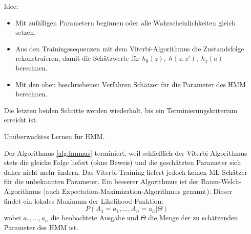 Idee:
\begin{itemize}
	\item Mit zufälligen Parametern beginnen oder alle Wahrscheinlichkeiten gleich setzen.
	\item Aus den Trainingssequenzen mit dem Viterbi-Algorithmus die Zustandsfolge rekonstruieren, damit die Schätzwerte für \(h_0(z),\; h(z,z'),\; h_z(a)\) berechnen.
	\item Mit den oben beschriebenen Verfahren Schätzer für die Parameter des HMM berechnen.
\end{itemize}
Die letzten beiden Schritte werden wiederholt, bis ein Terminierungskriterium erreicht ist.
\begin{algorithm}
	\begin{algorithmic}[1]
		\Repeat
	\end{algorithmic}
	\caption{Unüberwachtes Lernen für HMM.}
	\label{alg:hmmus}
\end{algorithm}
Der Algorithmus \ref{alg:hmmus} terminiert, weil schließlich der Viterbi-Algorithmus stets die gleiche Folge liefert (ohne Beweis) und die geschätzten Parameter sich daher nicht mehr ändern.
Das Viterbi-Training liefert jedoch keinen ML-Schätzer für die unbekannten
Parameter. Ein besserer Algorithmus ist der Baum-Welch-Algorithmus (auch
Expectation-Maximization-Algorithmus genannt).
Dieser findet ein lokales Maximum der Likelihood-Funktion:
	\[P(A_1=a_1, \dots, A_n=a_n|\Theta)\]
wobei \(a_1, \dots, a_n\) die beobachtete Ausgabe und \(\Theta\) die Menge der zu schätzenden Parameter des HMM ist.

